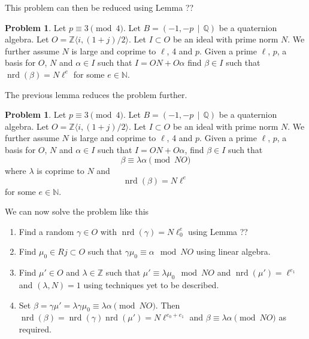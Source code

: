 \documentclass[10pt]{article}
\theoremstyle{plain}
\theoremstyle{definition}
\newtheorem{prob}[theorem]{Problem}
\newcommand{\op}{\operatorname}
\newcommand{\N}{\mathbb{N}}
\newcommand{\Z}{\mathbb{Z}}
\newcommand{\Q}{\mathbb{Q}}
\newcommand{\nrd}{\op{nrd}}
\begin{document}
This problem can then be reduced using Lemma ??

\begin{prob} \label{prob: ell power}
    Let \( p \equiv 3 \pmod{4} \).
    Let \( B =  (-1, -p \, \mid \, \Q) \) be a quaternion algebra.
    Let \( O = \Z \langle i, (1+j) / 2 \rangle \).
    Let \( I \subset O \) be an ideal with prime norm \( N \).
    We further assume \( N \) is large and coprime to \( \ell \), 4 and \( p \).
    Given a prime \( \ell \), \( p \), a basis for \( O \), \( N \) and \( \alpha \in I \) such that \( I = ON + O\alpha \) find \( \beta \in I \) such that \( \nrd(\beta) = N\ell^e \) for some \( e \in \N \).
\end{prob}


The previous lemma reduces the problem further.

\begin{prob} \label{prob: solve congruence}
    Let \( p \equiv 3 \pmod{4} \).
    Let \( B =  (-1, -p \, \mid \, \Q) \) be a quaternion algebra.
    Let \( O = \Z \langle i, (1+j) / 2 \rangle \).
    Let \( I \subset O \) be an ideal with prime norm \( N \).
    We further assume \( N \) is large and coprime to \( \ell \), 4 and \( p \).
    Given a prime \( \ell \), \( p \), a basis for \( O \), \( N \) and \( \alpha \in I \) such that \( I = ON + O\alpha \), find \( \beta \in I \) such that
    \[
        \beta \equiv \lambda \alpha \pmod{NO}
    \]
    where \(\lambda \) is coprime to \( N \) and
    \[
        \nrd(\beta) = N\ell^e
    \]
    for some \( e \in \N \).
\end{prob}

We can now solve the problem like this
\begin{enumerate}
    \item
          Find a random \( \gamma \in O \) with \( \nrd(\gamma) = N \ell^e_0 \) using Lemma ??
    \item
          Find \( \mu_0 \in Rj \subset  O \) such that \( \gamma\mu_0 \equiv \alpha \mod NO \) using linear algebra.
    \item
          Find \( \mu' \in  O \) and \( \lambda \in \Z \) such that \( \mu' \equiv \lambda \mu_0 \mod NO \) and \( \nrd(\mu') = \ell^{e_1} \) and \( (\lambda, N) = 1 \) using techniques yet to be described.
    \item
          Set \( \beta = \gamma \mu' = \lambda\gamma\mu_0 \equiv \lambda \alpha \pmod{NO} \). Then \( \nrd(\beta) = \nrd(\gamma)\nrd(\mu') = N\ell^{e_0 + e_1}\) and \( \beta \equiv \lambda \alpha \pmod{NO} \) as required.
\end{enumerate}
\end{document}
